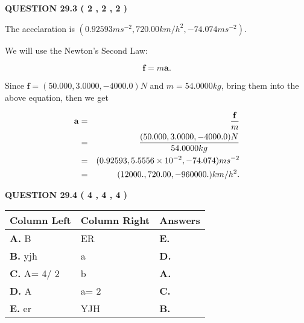\documentclass[12pt]{article}
\begin{document}
{\textbf{\Large{QUESTION
29.3 
 (           2 ,           2 ,           2 )
}}}
  
  
 
 
\noindent{}
 
 
The accelaration is
$(
0.92593ms^{-2},
720.00km/h^2,
-74.074ms^{-2}
).
$
 
 
 
 
 
 
\noindent{}

We will use the Newton's Second Law:
 
\[
\mathbf{f}=m\mathbf{a}.
\]
 
Since $\mathbf{f}=( %
50.000,  %
3.0000,  %
-4000.0 )N$
and $m= %
54.0000kg$, bring them into the above equation, then we get
 
\begin{eqnarray*}
\mathbf{a}&=&\frac{\mathbf{f}}m  \\
&=&\frac{(
50.000 ,
3.0000 ,
-4000.0 )N
}{ %
54.0000 kg}  \\
&=&(
0.92593 ,
5.5556 \times 10^{-2},
-74.074
)ms^{-2} \\
&=&(
12000. ,
720.00 ,
-960000.
)km/h^2.
\end{eqnarray*}
 
 
 
  
\vspace{0.2in}
  
{\textbf{\Large{QUESTION
29.4 
 (           4 ,           4 ,           4 )
}}}
  
  
 
 
\noindent{}
  
  
\begin{tabular}{|l|l|l|}
 \hline
 Column Left & Column Right  & Answers       \\ 
 \hline
{\textbf{\large{
A.}}}
B
  & 
ER
 & 
{\textbf{\large{
E.}}}
 \\ 
 \hline
{\textbf{\large{
B.}}}
yjh
  & 
a
 & 
{\textbf{\large{
D.}}}
 \\ 
 \hline
{\textbf{\large{
C.}}}
 A= %
4/ %
2

  & 
b
 & 
{\textbf{\large{
A.}}}
 \\ 
 \hline
{\textbf{\large{
D.}}}
A
  & 
 a= %
2
 & 
{\textbf{\large{
C.}}}
 \\ 
 \hline
{\textbf{\large{
E.}}}
er
  & 
YJH
 & 
{\textbf{\large{
B.}}}
 \\ 
 \hline
 \end{tabular}
  
\end{document}
